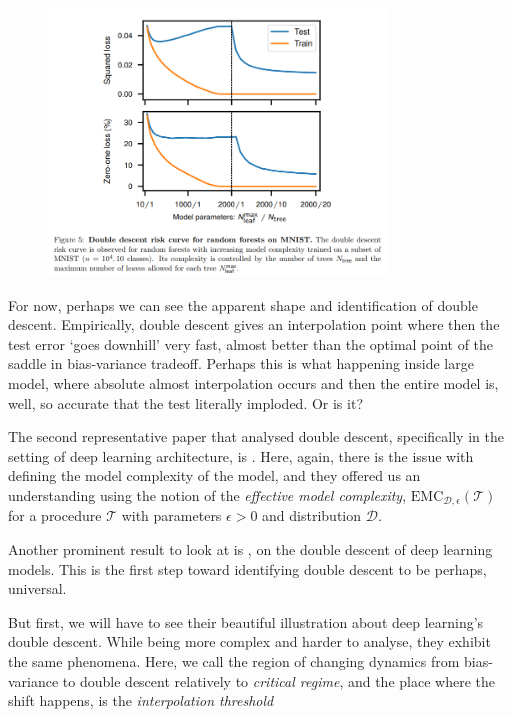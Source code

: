 \begin{figure}[h!]
    \centering
    \includegraphics[width=0.8\textwidth]{img/DSDD.png}
\end{figure}

For now, perhaps we can see the apparent shape and identification of double descent. Empirically, double descent gives an interpolation point where then the test error `goes downhill' very fast, almost better than the optimal point of the saddle in bias-variance tradeoff. Perhaps this is what happening inside large model, where absolute almost interpolation occurs and then the entire model is, well, so accurate that the test literally imploded. Or is it? 

The second representative paper that analysed double descent, specifically in the setting of deep learning architecture, is \cite{nakkiran_deep_2019}. Here, again, there is the issue with defining the model complexity of the model, and they offered us an understanding using the notion of the \textit{effective model complexity}, $\mathrm{EMC}_{\mathcal{D},\epsilon}(\mathcal{T})$ for a procedure $\mathcal{T}$ with parameters $\epsilon > 0$ and distribution $\mathcal{D}$. 

Another prominent result to look at is \cite{nakkiran_deep_2019}, on the double descent of deep learning models. This is the first step toward identifying double descent to be perhaps, universal. 

But first, we will have to see their beautiful illustration about deep learning's double descent. While being more complex and harder to analyse, they exhibit the same phenomena. Here, we call the region of changing dynamics from bias-variance to double descent relatively to \textit{critical regime}, and the place where the shift happens, is the \textit{interpolation threshold}

